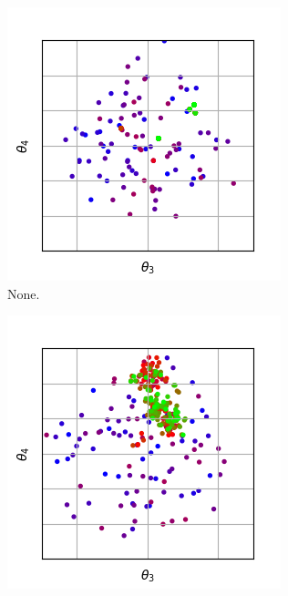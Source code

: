 \documentclass{llncs}
\begin{document}
\begin{figure}[t]
    \begin{subfigure}[t]{0.24\textwidth}
        \centering
        \captionsetup{width=.9\textwidth}
        \includegraphics[width=\textwidth]{figures/recombination/simple_normal-100-10_2-3.png}
        \caption{None.}
        \label{subfig:mutation_none_23}
    \end{subfigure}
    \begin{subfigure}[t]{0.24\textwidth}
        \centering
        \captionsetup{width=.9\textwidth}
        \includegraphics[width=\textwidth]{figures/mutation/simple_normal-100-10_none_normal-0.1_2-3.png}

\end{subfigure}
\end{figure}
\end{document}
